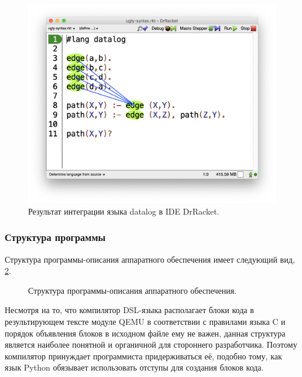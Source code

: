 \begin{figure}[!htbp]
    \centering
    \begin{adjustbox}{max totalsize={0.8\textwidth}{\textheight}}
        \includegraphics[]{images/racket-variable-arrow.png}
    \end{adjustbox}
    \caption{Результат интеграции языка datalog в IDE DrRacket.}\label{fig:racket-variable-arrow}
\end{figure}


\subsubsection{Структура программы}\label{sec:ch2/sec1/sub1/sub1}

Структура программы-описания аппаратного обеспечения имеет следующий вид, \cref{fig:device-program-structure}.

\begin{figure}[!htbp]
    \centering
    
    \caption{Структура программы-описания аппаратного обеспечения.}\label{fig:device-program-structure}
\end{figure}

Несмотря на то, что компилятор DSL-языка располагает
блоки кода в результирующем тексте модуле QEMU в соответствии
с правилами языка C и порядок объявления блоков в исходном файле ему не важен,
данная структура является наиболее понятной и органичной для стороннего разработчика.
Поэтому компилятор принуждает программиста придерживаться её, подобно тому, как
язык Python обязывает использовать отступы для создания блоков кода.

